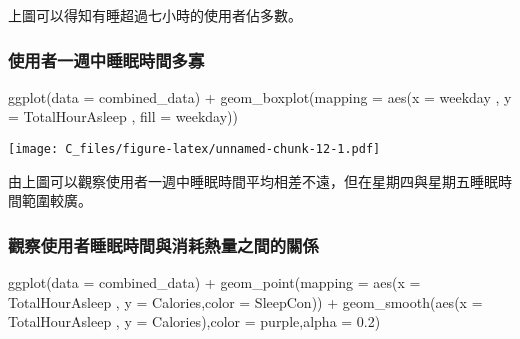 \documentclass[
]{article}
\newenvironment{Shaded}{\begin{snugshade}}{\end{snugshade}}
\newcommand{\AttributeTok}[1]{\textcolor[rgb]{0.77,0.63,0.00}{#1}}
\newcommand{\FloatTok}[1]{\textcolor[rgb]{0.00,0.00,0.81}{#1}}
\newcommand{\FunctionTok}[1]{\textcolor[rgb]{0.00,0.00,0.00}{#1}}
\newcommand{\NormalTok}[1]{#1}
\newcommand{\SpecialCharTok}[1]{\textcolor[rgb]{0.00,0.00,0.00}{#1}}
\newcommand{\StringTok}[1]{\textcolor[rgb]{0.31,0.60,0.02}{#1}}
\begin{document}
上圖可以得知有睡超過七小時的使用者佔多數。

\hypertarget{ux4f7fux7528ux8005ux4e00ux9031ux4e2dux7761ux7720ux6642ux9593ux591aux5be1}{%
\subsubsection{使用者一週中睡眠時間多寡}\label{ux4f7fux7528ux8005ux4e00ux9031ux4e2dux7761ux7720ux6642ux9593ux591aux5be1}}

\begin{Shaded}
\begin{Highlighting}[]
\FunctionTok{ggplot}\NormalTok{(}\AttributeTok{data =}\NormalTok{ combined\_data) }\SpecialCharTok{+} 
  \FunctionTok{geom\_boxplot}\NormalTok{(}\AttributeTok{mapping =} \FunctionTok{aes}\NormalTok{(}\AttributeTok{x =}\NormalTok{ weekday , }\AttributeTok{y =}\NormalTok{ TotalHourAsleep , }\AttributeTok{fill =}\NormalTok{ weekday))}
\end{Highlighting}
\end{Shaded}

\texttt{[image: C\_files/figure-latex/unnamed-chunk-12-1.pdf]}

由上圖可以觀察使用者一週中睡眠時間平均相差不遠，但在星期四與星期五睡眠時間範圍較廣。

\hypertarget{ux89c0ux5bdfux4f7fux7528ux8005ux7761ux7720ux6642ux9593ux8207ux6d88ux8017ux71b1ux91cfux4e4bux9593ux7684ux95dcux4fc2}{%
\subsubsection{觀察使用者睡眠時間與消耗熱量之間的關係}\label{ux89c0ux5bdfux4f7fux7528ux8005ux7761ux7720ux6642ux9593ux8207ux6d88ux8017ux71b1ux91cfux4e4bux9593ux7684ux95dcux4fc2}}

\begin{Shaded}
\begin{Highlighting}[]
\FunctionTok{ggplot}\NormalTok{(}\AttributeTok{data =}\NormalTok{ combined\_data) }\SpecialCharTok{+} 
  \FunctionTok{geom\_point}\NormalTok{(}\AttributeTok{mapping =} \FunctionTok{aes}\NormalTok{(}\AttributeTok{x =}\NormalTok{ TotalHourAsleep , }\AttributeTok{y =}\NormalTok{ Calories,}\AttributeTok{color =}\NormalTok{ SleepCon)) }\SpecialCharTok{+} 
  \FunctionTok{geom\_smooth}\NormalTok{(}\FunctionTok{aes}\NormalTok{(}\AttributeTok{x =}\NormalTok{ TotalHourAsleep , }\AttributeTok{y =}\NormalTok{ Calories),}\AttributeTok{color =} \StringTok{\textquotesingle{}purple\textquotesingle{}}\NormalTok{,}\AttributeTok{alpha =} \FloatTok{0.2}\NormalTok{)}
\end{Highlighting}
\end{Shaded}
\end{document}
